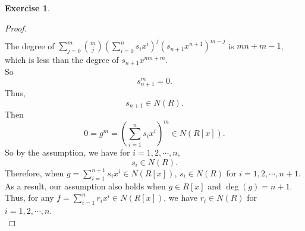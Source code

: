 \documentclass{amsart}
\theoremstyle{plain}
\theoremstyle{definition}
\newtheorem{exer}[lem]{Exercise}
\begin{document}
\begin{exer}
\begin{enumerate}[(a)]
\begin{proof}
\begin{align*}
	\end{align*}
	The degree of $\sum_{j=0}^{m} \binom mj\left(\sum_{i=0}^{n}s_ix^i \right)^{j}  \left(s_{n+1}x^{n+1}\right)^{m-j}$ is $mn+m-1$, which is less than the degree of $s_{n+1}x^{mn+m}$.\\
	So 
	\[s_{n+1}^m = 0. \]
	Thus,
	\[s_{n+1} \in N(R).\]
	Then 
	\[0 = g^m = \left(\sum_{i=1}^{n}s_ix^i \right)^m \in N(R[x]).\]
	So by the assumption, we have for $i = 1,2,\cdots,n$, 
	\[s_i \in N(R).\]
	Therefore, when $g = \sum_{i=1}^{n+1}s_ix^i \in N(R[x])$, $s_i \in N(R)$ for $i = 1,2,\cdots,n+1$.\\
	As a result, our assumption also holds when $g \in R[x]$ and $\deg(g) = n+1$.\\
	Thus, for any $f=\sum_{i=1}^nr_ix^i \in N(R[x])$, we have $r_i \in N(R)$ for $i=1,2,\cdots,n$.\\
\end{proof}


\end{enumerate}
\end{exer}
\end{document}
